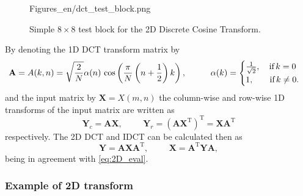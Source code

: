 \begin{figure}[b!]
	\centering
	\begin{minipage}[c]{0.68\textwidth}
	\begin{overpic}[width = 1\columnwidth ]{Figures_en/dct_test_block.png}
	\end{overpic}   \end{minipage}\hfill
		\begin{minipage}[c]{0.3\textwidth}
	\caption{Simple $8\times8$ test block for the 2D Discrete Cosine Transform.}
	\label{Fig:2D_DCT_test}  \end{minipage}
\end{figure}
By denoting the 1D DCT transform matrix by 
\begin{equation}
\mathbf{A} = A(k,n) =  \sqrt{\frac{2}{N}}  \alpha(n) \, \cos\left( \frac{\pi}{N} \left( n + \frac{1}{2}\right) k \right),
\hspace{10mm}
\alpha(k) = \begin{cases}  
\frac{1}{\sqrt{2}}, \hspace{3mm} \, \text{if} \, k = 0 \\
1, \hspace{6mm} \, \text{if} \, k \neq 0.
\label{Eq:1D_DCT_mx}
\end{cases}
\end{equation}
and the input matrix by $\mathbf{X} = X(m,n)$ the column-wise and row-wise 1D transforms of the input matrix are written as
\begin{equation}
\mathbf{Y}_{c} = \mathbf{A} \mathbf{X}, \hspace{1cm} \mathbf{Y}_r = \left( \mathbf{A} \mathbf{X}^{\mathrm{T}} \right)^{\mathrm{T}} = \mathbf{X} \mathbf{A}^{\mathrm{T}}
\end{equation}
respectively.
The 2D DCT and IDCT can be calculated then as
\begin{equation}
\mathbf{Y} = \mathbf{A} \mathbf{X} \mathbf{A}^{\mathrm{T}}, \hspace{1cm}
\mathbf{X} = \mathbf{A}^{\mathrm{T}} \mathbf{Y} \mathbf{A},
\label{Eq:2D_DCT_eval}
\end{equation}
being in agreement with \eqref{eq:2D_eval}.

\subsubsection*{Example of 2D transform}

